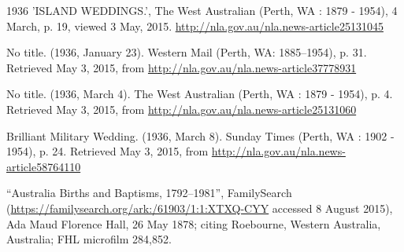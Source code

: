 \begin{thebibliography}{999}
    1936 'ISLAND WEDDINGS.', The West Australian (Perth, WA : 1879 - 1954), 4 March, p. 19, viewed 3 May, 2015.
    \url{http://nla.gov.au/nla.news-article25131045}

	No title. (1936, January 23). Western Mail (Perth, WA: 1885--1954), p. 31. Retrieved May 3, 2015,
	from \url{http://nla.gov.au/nla.news-article37778931}

	No title. (1936, March 4). The West Australian (Perth, WA : 1879 - 1954), p. 4.
	Retrieved May 3, 2015, from \url{http://nla.gov.au/nla.news-article25131060}

	Brilliant Military Wedding. (1936, March 8). Sunday Times (Perth, WA : 1902 - 1954), p. 24.
	Retrieved May 3, 2015, from \url{http://nla.gov.au/nla.news-article58764110}

	``Australia Births and Baptisms, 1792--1981'', FamilySearch
	(\url{https://familysearch.org/ark:/61903/1:1:XTXQ-CYY} accessed 8 August 2015),
	Ada Maud Florence Hall, 26 May 1878; citing Roebourne, Western Australia, Australia;
	FHL microfilm 284,852.

\end{thebibliography}
